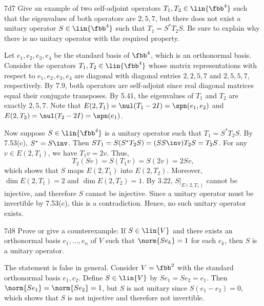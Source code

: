 \begin{exercise}{7d7}
    Give an example of two self-adjoint operators $T_1, T_2 \in \lin{\fbb^4}$ such that the eigenvalues of both operators are $2, 5, 7$, but there does not exist a unitary operator $S \in \lin{\fbb^4}$ such that $T_1 = S^\ast T_2 S$.
    Be sure to explain why there is no unitary operator with the required property.
\end{exercise}

\begin{sol}
    Let $e_1, e_2, e_3, e_4$ be the standard basis of $\fbb^4$, which is an orthonormal basis.
    Consider the operators $T_1, T_2 \in \lin{\fbb^4}$ whose matrix representations with respect to $e_1, e_2, e_3, e_4$ are diagonal with diagonal entries $2, 2, 5, 7$ and $2, 5, 5, 7$, respectively.
    By 7.9, both operators are self-adjoint since real diagonal matrices equal their conjugate transposes.
    By 5.41, the eigenvalues of $T_1$ and $T_2$ are exactly $2, 5, 7$.
    Note that $E(2, T_1) = \nul(T_1 - 2I) = \spn(e_1, e_2)$ and $E(2, T_2) = \nul(T_2 - 2I) = \spn(e_1)$.

    Now suppose $S \in \lin{\fbb^4}$ is a unitary operator such that $T_1 = S^\ast T_2 S$.
    By 7.53(c), $S^\ast = S\inv$.
    Then $ST_1 = S(S^\ast T_2 S) = (SS\inv) T_2 S = T_2 S$.
    For any $v \in E(2, T_1)$, we have $T_1 v = 2 v$.
    Thus,
    \[
        T_2 (S v) = S (T_1 v) = S(2 v) = 2 S v,
    \]
    which shows that $S$ maps $E(2, T_1)$ into $E(2, T_2)$.
    Moreover, $\dim E(2, T_1) = 2$ and $\dim E(2, T_2) = 1$.
    By 3.22, $S|_{E(2, T_1)}$ cannot be injective, 
    and therefore $S$ cannot be injective.
    Since a unitary operator must be invertible by 7.53(c), this is a contradiction.
    Hence, no such unitary operator exists.
\end{sol}

\begin{exercise}{7d8}
    Prove or give a counterexample: If $S \in \lin{V}$ and there exists an orthonormal basis $e_1, \ldots, e_n$ of $V$ such that $\norm{Se_k} = 1$ for each $e_k$, then $S$ is a unitary operator.
\end{exercise}

\begin{sol}
    The statement is false in general.
    Consider $V = \fbb^2$ with the standard orthonormal basis $e_1, e_2$.
    Define $S \in \lin{V}$ by $S e_1 = S e_2 = e_1$.
    Then $\norm{Se_1} = \norm{Se_2} = 1$, but $S$ is not unitary since $S(e_1 - e_2) = 0$, which shows that $S$ is not injective and therefore not invertible.
\end{sol}

